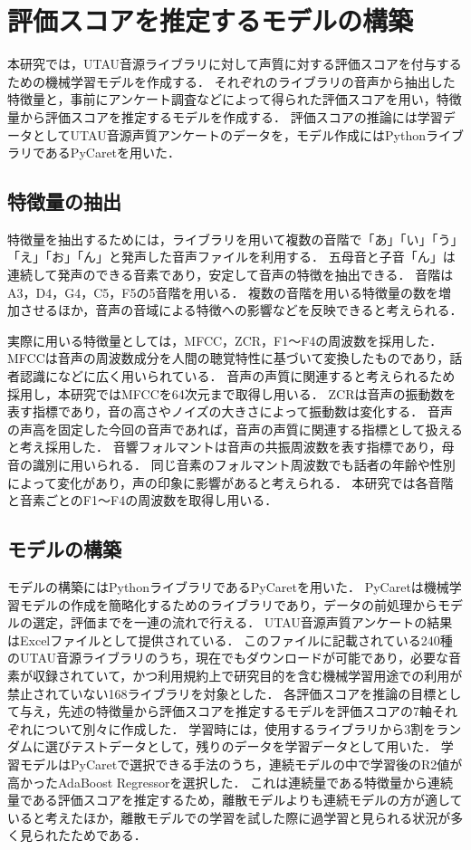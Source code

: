 \chapter{評価スコアを推定するモデルの構築}
\thispagestyle{myheadings}

本研究では，UTAU音源ライブラリに対して声質に対する評価スコアを付与するための機械学習モデルを作成する．
それぞれのライブラリの音声から抽出した特徴量と，事前にアンケート調査などによって得られた評価スコアを用い，特徴量から評価スコアを推定するモデルを作成する．
評価スコアの推論には学習データとしてUTAU音源声質アンケートのデータを，モデル作成にはPythonライブラリであるPyCaretを用いた．

\section{特徴量の抽出}
特徴量を抽出するためには，ライブラリを用いて複数の音階で「あ」「い」「う」「え」「お」「ん」と発声した音声ファイルを利用する．
五母音と子音「ん」は連続して発声のできる音素であり，安定して音声の特徴を抽出できる．
音階はA3，D4，G4，C5，F5の5音階を用いる．
複数の音階を用いる特徴量の数を増加させるほか，音声の音域による特徴への影響などを反映できると考えられる．

実際に用いる特徴量としては，MFCC，ZCR，F1〜F4の周波数を採用した．
MFCCは音声の周波数成分を人間の聴覚特性に基づいて変換したものであり，話者認識になどに広く用いられている．
音声の声質に関連すると考えられるため採用し，本研究ではMFCCを64次元まで取得し用いる．
ZCRは音声の振動数を表す指標であり，音の高さやノイズの大きさによって振動数は変化する．
音声の声高を固定した今回の音声であれば，音声の声質に関連する指標として扱えると考え採用した．
音響フォルマントは音声の共振周波数を表す指標であり，母音の識別に用いられる．
同じ音素のフォルマント周波数でも話者の年齢や性別によって変化があり\cite{formant}，声の印象に影響があると考えられる．
本研究では各音階と音素ごとのF1〜F4の周波数を取得し用いる．

\section{モデルの構築}
モデルの構築にはPythonライブラリであるPyCaretを用いた．
PyCaretは機械学習モデルの作成を簡略化するためのライブラリであり，データの前処理からモデルの選定，評価までを一連の流れで行える．
UTAU音源声質アンケートの結果はExcelファイルとして提供されている．
このファイルに記載されている240種のUTAU音源ライブラリのうち，現在でもダウンロードが可能であり，必要な音素が収録されていて，かつ利用規約上で研究目的を含む機械学習用途での利用が禁止されていない168ライブラリを対象とした．
各評価スコアを推論の目標として与え，先述の特徴量から評価スコアを推定するモデルを評価スコアの7軸それぞれについて別々に作成した．
学習時には，使用するライブラリから3割をランダムに選びテストデータとして，残りのデータを学習データとして用いた．
学習モデルはPyCaretで選択できる手法のうち，連続モデルの中で学習後のR2値が高かったAdaBoost Regressorを選択した．
これは連続量である特徴量から連続量である評価スコアを推定するため，離散モデルよりも連続モデルの方が適していると考えたほか，離散モデルでの学習を試した際に過学習と見られる状況が多く見られたためである．

